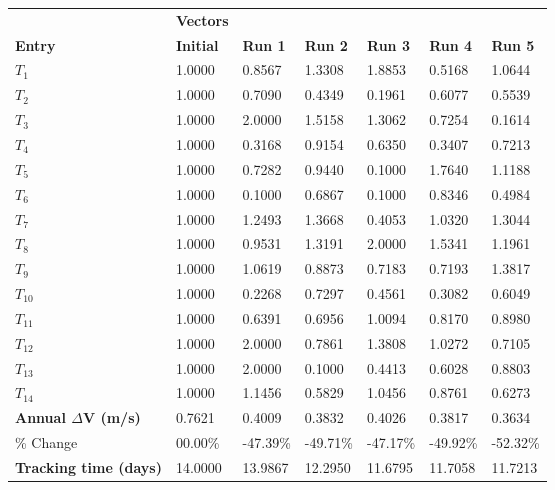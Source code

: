 \begin{table}[H]
\centering
\begin{tabular}{lllllll}
\textbf{} & \cellcolor[HTML]{EFEFEF}\textbf{Vectors} & \textbf{} & \textbf{} & \textbf{} & \textbf{} & \textbf{} \\
\rowcolor[HTML]{EFEFEF} \cellcolor[HTML]{EFEFEF}\textbf{Entry} & \cellcolor[HTML]{EFEFEF}\textbf{Initial} & \cellcolor[HTML]{EFEFEF}\textbf{Run 1} & \cellcolor[HTML]{EFEFEF}\textbf{Run 2} & \cellcolor[HTML]{EFEFEF}\textbf{Run 3} & \cellcolor[HTML]{EFEFEF}\textbf{Run 4} & \cellcolor[HTML]{EFEFEF}\textbf{Run 5} \\
$T_{1}$ & 1.0000 & 0.8567 & 1.3308 & 1.8853 & 0.5168 & 1.0644 \\
$T_{2}$ & 1.0000 & 0.7090 & 0.4349 & 0.1961 & 0.6077 & 0.5539 \\
$T_{3}$ & 1.0000 & 2.0000 & 1.5158 & 1.3062 & 0.7254 & 0.1614 \\
$T_{4}$ & 1.0000 & 0.3168 & 0.9154 & 0.6350 & 0.3407 & 0.7213 \\
$T_{5}$ & 1.0000 & 0.7282 & 0.9440 & 0.1000 & 1.7640 & 1.1188 \\
$T_{6}$ & 1.0000 & 0.1000 & 0.6867 & 0.1000 & 0.8346 & 0.4984 \\
$T_{7}$ & 1.0000 & 1.2493 & 1.3668 & 0.4053 & 1.0320 & 1.3044 \\
$T_{8}$ & 1.0000 & 0.9531 & 1.3191 & 2.0000 & 1.5341 & 1.1961 \\
$T_{9}$ & 1.0000 & 1.0619 & 0.8873 & 0.7183 & 0.7193 & 1.3817 \\
$T_{10}$ & 1.0000 & 0.2268 & 0.7297 & 0.4561 & 0.3082 & 0.6049 \\
$T_{11}$ & 1.0000 & 0.6391 & 0.6956 & 1.0094 & 0.8170 & 0.8980 \\
$T_{12}$ & 1.0000 & 2.0000 & 0.7861 & 1.3808 & 1.0272 & 0.7105 \\
$T_{13}$ & 1.0000 & 2.0000 & 0.1000 & 0.4413 & 0.6028 & 0.8803 \\
$T_{14}$ & 1.0000 & 1.1456 & 0.5829 & 1.0456 & 0.8761 & 0.6273 \\
\rowcolor[HTML]{EFEFEF} 
\cellcolor[HTML]{EFEFEF}\textbf{Annual $\Delta \boldsymbol{V}$ (m/s)} & \cellcolor[HTML]{EFEFEF}0.7621 & 0.4009 & 0.3832 & 0.4026 & 0.3817 & 0.3634 \\
\% Change & 00.00\% &-47.39\% & -49.71\% & -47.17\% & -49.92\% & -52.32\% \\
\rowcolor[HTML]{EFEFEF} 
\cellcolor[HTML]{EFEFEF}\textbf{Tracking time (days)} & \cellcolor[HTML]{EFEFEF}14.0000 & 13.9867 & 12.2950 & 11.6795 & 11.7058 & 11.7213 \\

\end{tabular}
\end{table}
